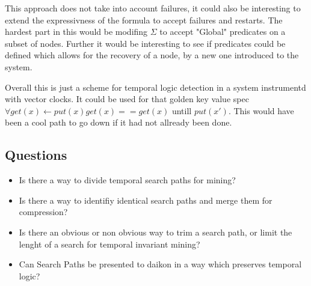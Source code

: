 This approach does not take into account failures, it could also be interesting
to extend the expressivness of the formula to accept failures and restarts. The
hardest part in this would be modifing $\Sigma$ to accept "Global" predicates
on a subset of nodes. Further it would be interesting to see if predicates
could be defined which allows for the recovery of a node, by a new one
introduced to the system.

Overall this is just a scheme for temporal logic detection in a system
instrumentd with vector clocks. It could be used for that golden key value spec
$\forall get(x) \leftarrow put(x) get(x) == get(x)$ untill $put(x')$. This would have been a cool path to go down if it had not allready been done.

\subsection{Questions}

\begin{itemize}
    \item Is there a way to divide temporal search paths for mining?
    \item Is there a way to identifiy identical search paths and merge them for compression?
       \item Is there an obvious or non obvious way to trim a search path, or limit the lenght of a search for temporal invariant mining?
       \item Can Search Paths be presented to daikon in a way which preserves temporal logic?
\end{itemize}




